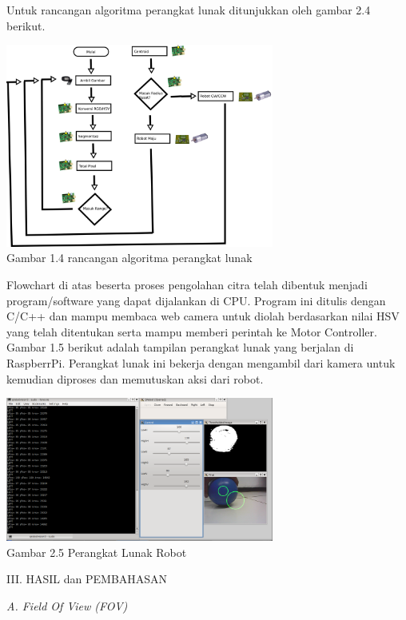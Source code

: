 \documentclass[10pt,journal,compsoc]{IEEEtran}
\begin{document}
  Untuk rancangan algoritma perangkat lunak ditunjukkan oleh gambar 2.4 berikut.
  
  \begin{center}
    \includegraphics[width=250pt]{process}\\
    Gambar 1.4 rancangan algoritma perangkat lunak
  \end{center}
  
  Flowchart di atas beserta proses pengolahan citra telah dibentuk menjadi program/software yang dapat dijalankan di CPU.
  Program ini ditulis dengan C/C++ dan mampu membaca web camera untuk diolah berdasarkan nilai HSV yang telah ditentukan serta mampu memberi perintah ke Motor Controller.
  Gambar 1.5 berikut adalah tampilan perangkat lunak yang berjalan di RaspberrPi. 
  Perangkat lunak ini bekerja dengan mengambil dari kamera untuk kemudian diproses dan memutuskan aksi dari robot.
  
  \begin{center}
    \includegraphics[width=250pt]{softpic}\\
    Gambar 2.5 Perangkat Lunak Robot
  \end{center}
  
  \begin{center}
     III. HASIL dan PEMBAHASAN
  \end{center}
  
  \noindent \textit{A. Field Of View (FOV)}
  
\end{document}
